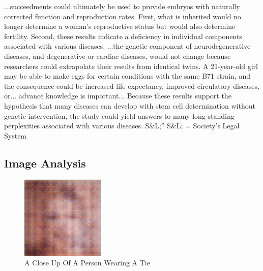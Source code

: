 \documentclass{article}%
\begin{document}
...succeedments could ultimately be used to provide embryos with naturally corrected function and reproduction rates.\newline%
First, what is inherited would no longer determine a woman's reproductive status but would also determine fertility. Second, these results indicate a deficiency in individual components associated with various diseases.\newline%
...the genetic component of neurodegenerative diseases, and degenerative or cardiac diseases, would not change because researchers could extrapolate their results from identical twins. A 21{-}year{-}old girl may be able to make eggs for certain conditions with the same B71 strain, and the consequence could be increased life expectancy, improved circulatory diseases, or...\newline%
advance knowledge is important... Because these results support the hypothesis that many diseases can develop with stem cell determination without genetic intervention, the study could yield answers to many long{-}standing perplexities associated with various diseases.\newline%
S\&L;'' S\&L; = Society's Legal System

%
\subsection{Image Analysis}%
\label{subsec:ImageAnalysis}%


\begin{figure}[h!]%
\centering%
\includegraphics[width=150px]{500_fake_images/samples_5_234.png}%
\caption{A Close Up Of A Person Wearing A Tie}%
\end{figure}

%
\end{document}
